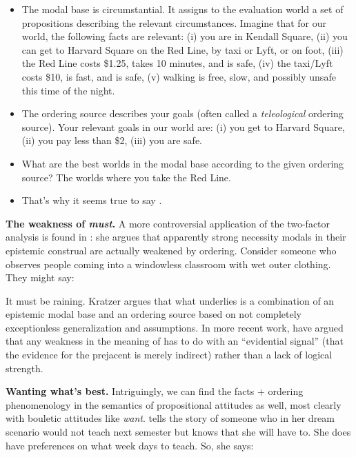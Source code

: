 \begin{itemize}
\item The modal base is circumstantial. It assigns to the evaluation world a set
  of propositions describing the relevant circumstances. Imagine that for our
  world, the following facts are relevant: (i) you are in Kendall Square, (ii)
  you can get to Harvard Square on the Red Line, by taxi or Lyft, or on foot,
  (iii) the Red Line costs \$1.25, takes 10 minutes, and is safe, (iv) the
  taxi/Lyft costs \$10, is fast, and is safe, (v) walking is free, slow, and
  possibly unsafe this time of the night.
\item The ordering source describes your goals (often called a
  \emph{teleological} ordering source). Your relevant goals in our world are:
  (i) you get to Harvard Square, (ii) you pay less than \$2, (iii) you are safe.
\item What are the best worlds in the modal base according to the given ordering
  source? The worlds where you take the Red Line.
\item That's why it seems true to say \Last.
\end{itemize}

\textbf{The weakness of \emph{must}.} A more controversial application of the two-factor analysis is found in
\cite{kratzer-1991-modality}: she argues that apparently strong necessity modals
in their epistemic construal are actually weakened by ordering. Consider someone
who observes people coming into a windowless classroom with wet outer clothing.
They might say:

\ex It must be raining. \xe
%
Kratzer argues that what underlies \Last is a combination of an epistemic modal
base and an ordering source based on not completely exceptionless generalization
and assumptions. %
%
In more recent work, \cite{fintel-gillies-2010-mss} have argued
that any weakness in the meaning of \Last has to do with an ``evidential
signal'' (that the evidence for the prejacent is merely indirect) rather than a
lack of logical strength. 

\textbf{Wanting what's best.} Intriguingly, we can find the facts + ordering phenomenology in the semantics of
propositional attitudes as well, most clearly with bouletic attitudes like
\emph{want}. \cite{heim-1992-attitude} tells the story of someone who in her
dream scenario would not teach next semester but knows that she will have to.
She does have preferences on what week days to teach. So, she says:

